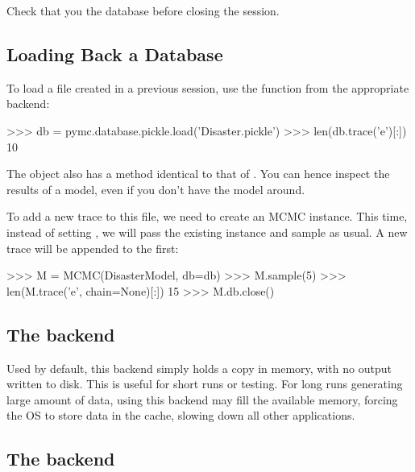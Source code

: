 \documentclass[]{jss}
\begin{document}
Check that you  the database before closing the  session.



\subsection{Loading Back a Database}
  \label{loading-back-a-database}%


To load a file created in a previous session, use the  function
from the appropriate backend:
%
\begin{CodeInput}
>>> db = pymc.database.pickle.load('Disaster.pickle')
>>> len(db.trace('e')[:])
10    
\end{CodeInput}

The  object also has a  method identical to that of .
You can hence inspect the results of a model, even if you don't have the model
around.

To add a new trace to this file, we need to create an MCMC instance. This time,
instead of setting , we will pass the existing 
instance and sample as usual. A new trace will be appended to the first:

\begin{CodeInput}
>>> M = MCMC(DisasterModel, db=db)
>>> M.sample(5)
>>> len(M.trace('e', chain=None)[:])
15
>>> M.db.close()    
\end{CodeInput}





\subsection[ram]{The  backend}
  \label{ram}%


Used by default, this backend simply holds a copy in memory, with no output
written to disk. This is useful for short runs or testing. For long runs
generating large amount of data, using this backend may fill the available
memory, forcing the OS to store data in the cache, slowing down all other
applications.



\subsection[no_trace]{The  backend}
  \label{no-trace}%
\end{document}
